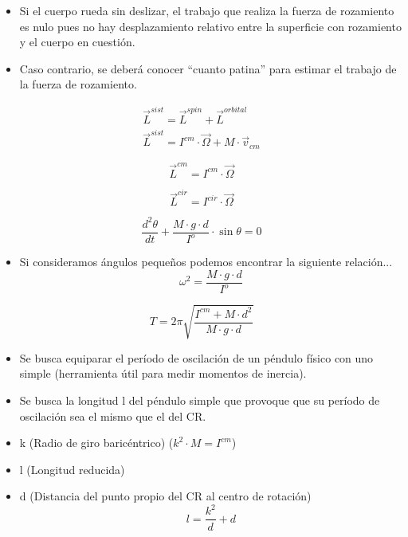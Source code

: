 \begin{itemize}
    \item Si el cuerpo rueda sin deslizar, el trabajo que realiza la fuerza de rozamiento es nulo pues no hay desplazamiento relativo entre la superficie con rozamiento y el cuerpo en cuestión.
    \item Caso contrario, se deberá conocer ``cuanto patina'' para estimar el trabajo de la fuerza de rozamiento.
\end{itemize}

\begin{equation}
\begin{split}
    \vec{L}^{sist} = \vec{L}^{spin} + \vec{L}^{orbital}\\
    \vec{L}^{sist} = I^{cm} \cdot \Vec{\Omega} + M \cdot \Vec{v}_{cm}
\end{split}
\end{equation}

\begin{equation}
    \vec{L}^{cm} = I^{cm} \cdot \Vec{\Omega}
\end{equation}

\begin{equation}
    \vec{L}^{cir} = I^{cir} \cdot \Vec{\Omega}
\end{equation}


\begin{equation}
    \frac{d^2 \theta}{dt} + \frac{M\cdot g\cdot d}{I^o} \cdot \sin{\theta} = 0
\end{equation}
\begin{itemize}
    \item Si consideramos ángulos pequeños podemos encontrar la siguiente relación...
    \begin{equation}
        \omega^2 = \frac{M\cdot g\cdot d}{I^o}
    \end{equation}
\end{itemize}

\begin{equation}
    T = 2\pi\sqrt{\frac{I^{cm}+M\cdot d^2}{M\cdot g\cdot d}}
\end{equation}

\begin{itemize}
    \item Se busca equiparar el período de oscilación de un péndulo físico con uno simple (herramienta útil para medir momentos de inercia).
    \item Se busca la longitud l del péndulo simple que provoque que su período de oscilación sea el mismo que el del CR.
    \item k (Radio de giro baricéntrico) ($k^2 \cdot M = I^{cm}$)
    \item l (Longitud reducida)
    \item d (Distancia del punto propio del CR al centro de rotación)
    \begin{equation}
        l = \frac{k^2}{d} + d
    \end{equation}
\end{itemize}